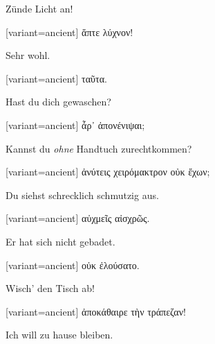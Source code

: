 Zünde Licht an!

\switchcolumn

\begin{greek}[variant=ancient]%
ἅπτε λύχνον!

\end{greek}%
\switchcolumn*

Sehr wohl.

\switchcolumn

\begin{greek}[variant=ancient]%
ταῦτα.

\end{greek}%
\switchcolumn*

Hast du dich gewaschen?

\switchcolumn

\begin{greek}[variant=ancient]%
ἆρ᾽ ἀπονένιψαι;

\end{greek}%
\switchcolumn*

Kannst du \emph{ohne} Handtuch zurechtkommen?

\switchcolumn

\begin{greek}[variant=ancient]%
ἀνύτεις χειρόμακτρον οὐκ ἔχων;

\end{greek}%
\switchcolumn*

Du siehst schrecklich schmutzig aus.

\switchcolumn

\begin{greek}[variant=ancient]%
αὐχμεῖς αἰσχρῶς.

\end{greek}%
\switchcolumn*

Er hat sich nicht gebadet.

\switchcolumn

\begin{greek}[variant=ancient]%
οὐκ ἐλούσατο.

\end{greek}%
\switchcolumn*

Wisch' den Tisch ab!

\switchcolumn

\begin{greek}[variant=ancient]%
ἀποκάθαιρε τὴν τράπεζαν!

\end{greek}%
\switchcolumn*

Ich will zu hause bleiben.

\switchcolumn


